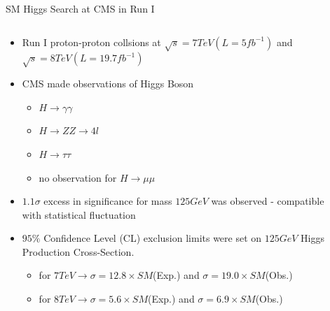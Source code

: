 \documentclass[pdf, 9pt]{beamer}
\begin{document}

  \begin{frame}{SM Higgs Search at CMS in Run I}
    \begin{columns}[T]
      \begin{column}{0.7\textwidth}
        \begin{itemize}
          \item Run I proton-proton collsions at $\sqrt{s}=7 TeV (L = 5 fb^{-1})$ and $\sqrt{s}=8 TeV (L = 19.7 fb^{-1})$
          \item CMS made observations of Higgs Boson
            \begin{itemize}
              \item $H \rightarrow \gamma\gamma$
              \item $H \rightarrow ZZ \rightarrow 4l$
              \item $H \rightarrow \tau\tau$
              \item \alert{no observation for $H \rightarrow \mu\mu$}
            \end{itemize}
          \item \alert{$1.1\sigma$ excess in significance} for mass $125GeV$ was observed - compatible with statistical fluctuation
          \item $95\%$ Confidence Level (CL) exclusion limits were set on $125GeV$ Higgs Production Cross-Section.
            \begin{itemize}
              \item for $7TeV \rightarrow \sigma = 12.8 \times SM$(Exp.) and \alert{$\sigma = 19.0 \times SM$(Obs.)}
              \item for $8TeV \rightarrow \sigma = 5.6 \times SM$(Exp.) and \alert{$\sigma = 6.9 \times SM$(Obs.)}
            \end{itemize}
        \end{itemize}
      \end{column}
      \begin{column}{0.3\textwidth}

\end{column}
\end{columns}
\end{frame}
\end{document}
